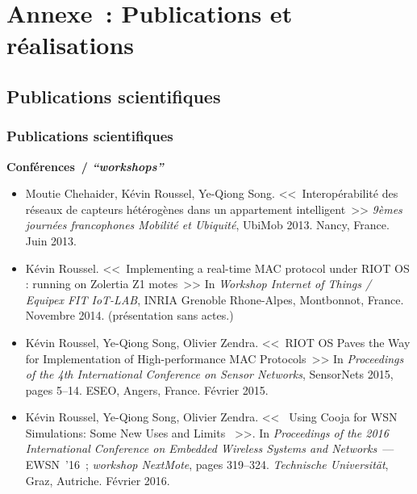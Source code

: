 \documentclass[10pt,c]{beamer}
\newcommand{\lang}[1]{\textit{#1}}
\begin{document}

\appendix


\section{Annexe~: Publications et réalisations}


\subsection{Publications scientifiques}

\begin{frame}[label=publis]
\frametitle{Publications scientifiques}

\tiny

\textbf{Conférences~/ \lang{``workshops''}}
\begin{itemize}
\item Moutie Chehaider, Kévin Roussel, Ye-Qiong Song.
<<~Interopérabilité des réseaux de capteurs hétérogènes dans
un appartement intelligent~>>
\textit{9èmes journées francophones Mobilité et Ubiquité}, UbiMob 2013.
Nancy, France. Juin 2013.
\item Kévin Roussel.
<<~Implementing a real-time MAC protocol under RIOT OS : running on
Zolertia Z1 motes~>>
In \textit{Workshop Internet of Things / Equipex FIT IoT-LAB},
INRIA Grenoble Rhone-Alpes, Montbonnot, France. Novembre 2014.
(présentation sans actes.)
\item Kévin Roussel, Ye-Qiong Song, Olivier Zendra.
<<~RIOT OS Paves the Way for Implementation of High-performance
MAC Protocols~>>
In \textit{Proceedings of the 4th International Conference
on Sensor Networks}, SensorNets 2015, pages 5--14.
ESEO, Angers, France. Février 2015.
\item Kévin Roussel, Ye-Qiong Song, Olivier Zendra.
<<~ Using Cooja for WSN Simulations: Some New Uses and Limits ~>>.
In \textit{Proceedings of the 2016 International Conference on Embedded
Wireless Systems and Networks}~--- EWSN~'16~; \lang{workshop NextMote},
pages 319--324.
\lang{Technische Universit\"at}, Graz, Autriche. Février 2016.
\end{itemize}


\end{frame}
\end{document}
